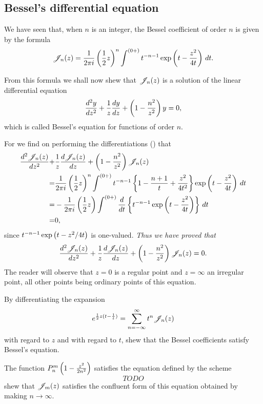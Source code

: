 \documentclass{book}
\begin{document}
\subsection{Bessel's differential equation}
We have seen that, when $n$ is an integer, the Bessel coefficient of
order $n$ is given by the formula
$$
\mathscr{J}_n(z)
=
\frac{1}{2\pi i} 
\left( \frac{1}{2} z \right)^n
\int^{(0+)}
t^{-n-1}
\exp\left(  t - \frac{z^2}{4t}   \right)
\, d t.
$$

From this formula we shall now shew that $\mathscr{J}_n(z)$ is a solution of the
linear differential equation
$$
\frac{d^2 y}{dz^2}
+ \frac{1}{z} \frac{dy}{dz}
+ \left(  1 - \frac{n^2}{z^2}   \right) y
= 0,
$$
which is called Bessel's equation for functions of order $n$.

For we find on performing the differentiations 
() that
\begin{align*}
\frac{d^2 \besJ_n(z)}{dz^2}
+& \frac{1}{z} \frac{d \besJ_n(z)}{dz}
+ \theparen{ 1 - \frac{n^2}{z^2}  } \besJ_n(z)
 \\
%
=& 
\frac{1}{2\pi i} 
\theparen{ \half z  }^n 
\int^{(0+)}
t^{-n-1}
\thebrace{ 1 - \frac{n+1}{t} + \frac{z^2}{4t^2}  }
\exp\theparen{ t - \frac{z^2}{4t}  }
\dmeasure t \\
%
=& 
-\frac{1}{2\pi i}
\theparen{ \half z  }
\int^{(0+)}
\frac{d}{dt} \thebrace{ t^{-n-1} \exp\theparen{ t - \frac{z^2}{4t}  }
}
\dmeasure t \\
%
=& 0,
\end{align*}
since $t^{-n-1} \exp\left(  t - z^2/4t   \right)$ is one-valued.
\emph{Thus we have proved that }
$$
\frac{d^2 \mathscr{J}_n(z)}{dz^2}
+ \frac{1}{z} \frac{d \mathscr{J}_n(z)}{dz}
+ \left(  1 - \frac{n^2}{z^2}   \right) \mathscr{J}_n(z) 
= 0.
$$
The reader will observe that $z=0$ is a regular point and 
$z = \infty$ an irregular point, all other points being ordinary
points of this equation.
%
%
\begin{wandwexample}
  By differentiating the expansion
  $$
  e^{\frac{1}{2} z (t - \frac{1}{t})} = \sum_{n=-\infty}^{\infty} t^n \mathscr{J}_n(z)
  $$
  with regard to $z$ and with regard to $t$, shew that the Bessel
  coefficients satisfy Bessel's equation.
\end{wandwexample}
\begin{wandwexample}
  The function $P_n^m\left(  1 - \frac{z^2}{2n^2}   \right)$ satisfies the
  equation defined by the scheme
  $$
  TODO
  $$
  shew that $\mathscr{J}_m(z)$ satisfies the confluent form of this equation
  obtained by making $n \rightarrow \infty$.
\end{wandwexample}
\end{document}
